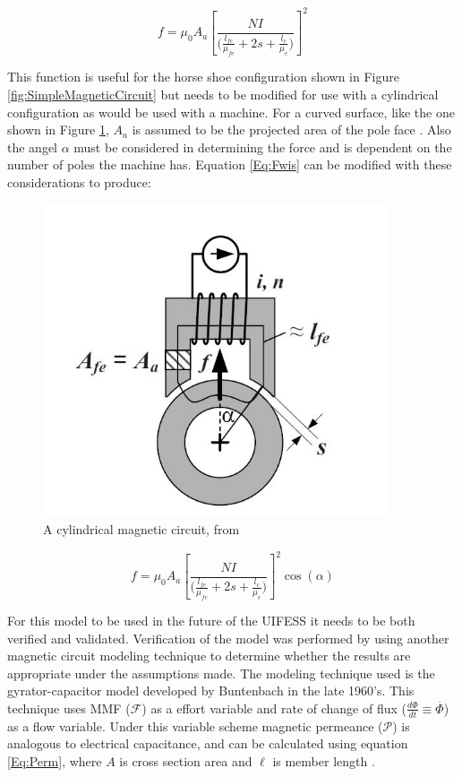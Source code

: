 \begin{equation}\label{Eq:Fwis}
	f={\mu}_{0}{A}_{a}{\left[\frac{NI}{\Big(\frac{{l}_{fe}}{{\mu}_{fe}}+2s+\frac{{l}_{c}}{{\mu}_{c}}\Big)}\right]}^{2}
\end{equation}

This function is useful for the horse shoe configuration shown in Figure \ref{fig:SimpleMagneticCircuit} but needs to be modified for use with a cylindrical configuration as would be used with a machine. For a curved surface, like the one shown in Figure \ref{fig:CurvedMagneticCircuit},  $A_a$ is assumed to be the projected area of the pole face \cite{MagBear}. Also the angel $\alpha$ must be considered in determining the force and is dependent on the number of poles the machine has. Equation \ref{Eq:Fwis} can be modified with these considerations to produce:

\begin{figure}[h]
	\centering
	\includegraphics[width=4in]{./Pictures/CircularMagneticCircuit.jpg}
	\caption{A cylindrical magnetic circuit, from \cite{MagBear}}
	\label{fig:CurvedMagneticCircuit}
\end{figure}

\begin{equation}\label{Eq:FwisAlpha}
	f={\mu}_{0}{A}_{a}{\left[\frac{NI}{\Big(\frac{{l}_{fe}}{{\mu}_{fe}}+2s+\frac{{l}_{c}}{{\mu}_{c}}\Big)}\right]}^{2}\cos(\alpha)
\end{equation}



For this model to be used in the future of the UIFESS it needs to be both verified and validated. Verification of the model was performed by using another magnetic circuit modeling technique to determine whether the results are appropriate under the assumptions made. The modeling technique used is the gyrator-capacitor model developed by Buntenbach in the late 1960's. This technique uses MMF ($\mathcal{F}$) as a effort variable and rate of change of flux ($\frac{d\Phi }{dt}\equiv\stackrel{.}{\Phi}$) as a flow variable. Under this variable scheme magnetic permeance ($\mathcal{P}$) is analogous to electrical capacitance, and can be calculated using equation \ref{Eq:Perm}, where $A$ is cross section area and $\ell$ is member length \cite{GyrCapApp}.

